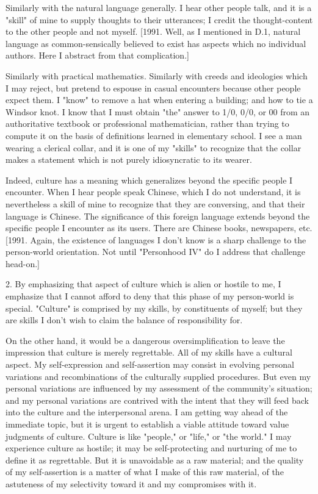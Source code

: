 Similarly with the natural language generally. I hear other people talk, and it is a "skill" of mine to supply thoughts to their utterances; I credit the thought-content to the other people and not myself. [1991. Well, as I mentioned in D.1, natural language as common-sensically believed to exist has aspects which no individual authors. Here I abstract from that complication.]

Similarly with practical mathematics. Similarly with creeds and ideologies which I may reject, but pretend to espouse in casual encounters because other people expect them. I "know" to remove a hat when entering a building; and how to tie a Windsor knot. I know that I must obtain "the" answer to 1/0, 0/0, or 00 from an authoritative textbook or professional mathematician, rather than trying to compute it on the basis of definitions learned in elementary school. I see a man wearing a clerical collar, and it is one of my "skills" to recognize that the collar makes a statement which is not purely idiosyncratic to its wearer.

Indeed, culture has a meaning which generalizes beyond the specific people I encounter. When I hear people speak Chinese, which I do not understand, it is nevertheless a skill of mine to recognize that they are conversing, and that their language is Chinese. The significance of this foreign language extends beyond the specific people I encounter as its users. There are Chinese books, newspapers, etc. [1991. Again, the existence of languages I don't know is a sharp challenge to the person-world orientation. Not until "Personhood IV" do I address that challenge head-on.]

2. By emphasizing that aspect of culture which is alien or hostile to me, I emphasize that I cannot afford to deny that this phase of my person-world is special. "Culture" is comprised by my skills, by constituents of myself; but they are skills I don't wish to claim the balance of responsibility for.

On the other hand, it would be a dangerous oversimplification to leave the impression that culture is merely regrettable. All of my skills have a cultural aspect. My self-expression and self-assertion may consist in evolving personal variations and recombinations of the culturally supplied procedures. But even my personal variations are influenced by my assessment of the community's situation; and my personal variations are contrived with the intent that they will feed back into the culture and the interpersonal arena. I am getting way ahead of the immediate topic, but it is urgent to establish a viable attitude toward value judgments of culture. Culture is like "people," or "life," or "the world." I may experience culture as hostile; it may be self-protecting and nurturing of me to define it as regrettable. But it is unavoidable as a raw material; and the quality of my self-assertion is a matter of what I make of this raw material, of the astuteness of my selectivity toward it and my compromises with it.

